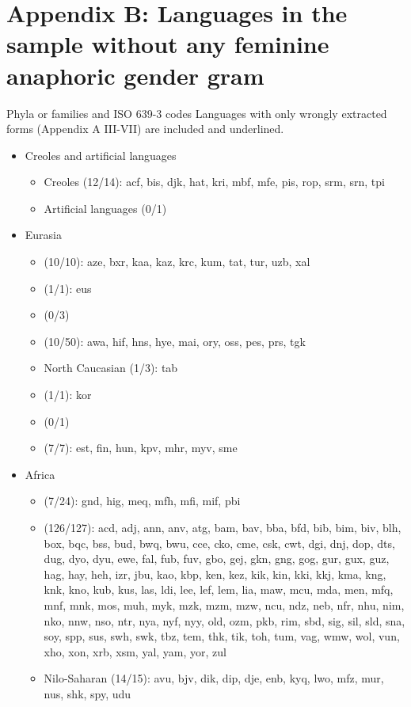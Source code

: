 
\section*{Appendix B: Languages in the sample without any feminine anaphoric gender gram \normalfont [629 languages]}

\noindent Phyla or families and ISO 639-3 codes
\noindent Languages with only wrongly extracted forms (Appendix A III-VII) are included and underlined.

\begin{itemize}[label={},leftmargin=0cm,labelindent=5pt,itemindent=0pt]
  \item Creoles and artificial languages
    \begin{itemize}[label={},leftmargin=!,labelindent=5pt,itemindent=-15pt]
  	\item Creoles (12/14): acf, bis, djk, hat, kri, mbf, mfe, pis, rop, srm, srn, tpi
  	\item Artificial languages (0/1)
  \end{itemize}

  \item Eurasia
    \begin{itemize}[label={},leftmargin=!,labelindent=5pt,itemindent=-15pt]
  	\item {} (10/10): aze, bxr, kaa, kaz, krc, kum, tat, tur, uzb, xal
  	\item {} (1/1): eus
  	\item {} (0/3)
  	\item {} (10/50): awa, hif, hns, hye, mai, ory, oss, pes, prs, tgk
  	\item North Caucasian (1/3): tab
  	\item {} (1/1): kor
  	\item {} (0/1)
  	\item {} (7/7): est, fin, hun, kpv, mhr, myv, sme
  \end{itemize}

  \item Africa
    \begin{itemize}[label={},leftmargin=!,labelindent=5pt,itemindent=-15pt]
  	\item {} (7/24): gnd, hig, meq, mfh, mfi, mif, pbi
  	\item {} (126/127): acd, adj, ann, anv, atg, bam, bav, bba, bfd, bib, bim, biv, blh, box, bqc, bss, bud, bwq, bwu, cce, cko, cme, csk, cwt, dgi, dnj, dop, dts, dug, dyo, dyu, ewe, fal, fub, fuv, gbo, gej, gkn, gng, gog, gur, gux, guz, hag, hay, heh, izr, jbu, kao, kbp, ken, kez, kik, kin, kki, kkj, kma, kng, knk, kno, kub, kus, las, ldi, lee, lef, lem, lia, maw, mcu, mda, men, mfq, mnf, mnk, mos, muh, myk, mzk, mzm, mzw, ncu, ndz, neb, nfr, nhu, nim, nko, nnw, nso, ntr, nya, nyf, nyy, old, ozm, pkb, rim, sbd, sig, sil, sld, sna, soy, spp, sus, swh, swk, tbz, tem, thk, tik, toh, tum, vag, wmw, wol, vun, xho, xon, xrb, xsm, yal, yam, yor, zul
  	\item Nilo-Saharan (14/15): avu, bjv, dik, dip, dje, enb, kyq, lwo, mfz, mur, nus, shk, spy, udu
    \end{itemize}


\end{itemize}
